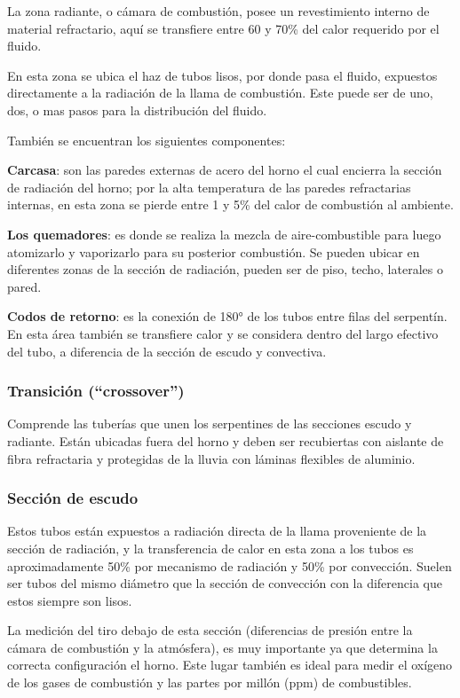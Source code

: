 \par La zona radiante, o cámara de combustión, posee un revestimiento interno de material refractario, aquí se transfiere entre 60 y 70\% del calor requerido por el fluido.
\par En esta zona se ubica el haz de tubos lisos, por donde pasa el fluido, expuestos directamente a la radiación de la llama de combustión. Este puede ser de uno, dos, o mas pasos para la distribución del fluido.
\par También se encuentran los siguientes componentes:
\par \textbf{Carcasa}: son las paredes externas de acero del horno el cual encierra la sección de radiación del horno; por la alta temperatura de las paredes refractarias internas, en esta zona se pierde entre 1 y 5\% del calor de combustión al ambiente.
\par \textbf{Los quemadores}: es donde se realiza la mezcla de aire-combustible para luego atomizarlo y vaporizarlo para su posterior combustión. Se pueden ubicar en diferentes zonas de la sección de radiación, pueden ser de piso, techo, laterales o pared.
\par \textbf{Codos de retorno}: es la conexión de 180° de los tubos entre filas del serpentín. En esta área también se transfiere calor y se considera dentro del largo efectivo del tubo, a diferencia de la sección de escudo y convectiva.

\subsubsection{Transición (``crossover'')}
\par Comprende las tuberías que unen los serpentines de las secciones escudo y radiante. Están ubicadas fuera del horno y deben ser recubiertas con aislante de fibra refractaria y protegidas de la lluvia con láminas flexibles de aluminio.

\subsubsection{Sección de escudo}
\par Estos tubos están expuestos a radiación directa de la llama proveniente de la sección de radiación, y la transferencia de calor en esta zona a los tubos es aproximadamente 50\% por mecanismo de radiación y 50\% por convección. Suelen ser tubos del mismo diámetro que la sección de convección con la diferencia que estos siempre son lisos.
\par La medición del tiro debajo de esta sección (diferencias de presión entre la cámara de combustión y la atmósfera), es muy importante ya que determina la correcta configuración el horno. Este lugar también es ideal para medir el oxígeno de los gases de combustión y las partes por millón (ppm) de combustibles.

